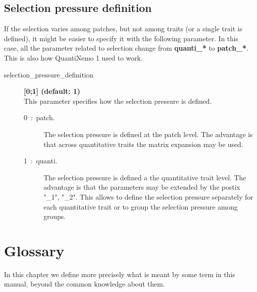 \documentclass[letterpaper,12pt,oneside]{book}
\begin{document}
\begin{appendices}
\section{Selection pressure definition}\label{chap:SelectionPressureDefinition}
If the selection varies among patches, but not among traits (or a single trait is defined), it might be easier to specify it with the following parameter. In this case, all the parameter related to selection change from \textbf{quanti\_*} to \textbf{patch\_*}. This is also how QuantiNemo 1 used to work. 
\begin{description}
\item[selection\_pressure\_definition\index{}]\textbf{[0;1] (default: 1)}\\
This parameter specifies how the selection pressure is defined. 
\begin{description}
\item[0~:~patch.] The selection pressure is defined at the patch level. The advantage is that across quantitative traits the matrix expansion may be used.
\item[1~:~quanti.] The selection pressure is defined a the quantitative trait level. The advantage is that the parameters may be extended by the postix "\_1", "\_2". This allows to define the selection pressure separately for each quantitative trait or to group the selection pressure among groups.
\end{description}
\end{description}
\chapter{Glossary}\label{chap:Glossary}
In this chapter we define more precisely what is meant by some term in this manual, beyond the common knowledge about them. 


\end{appendices}
\end{document}

